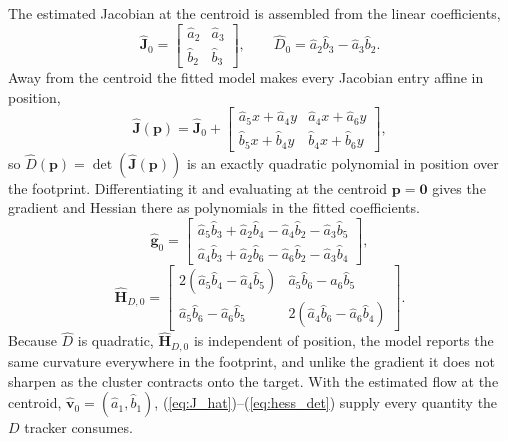 \documentclass[lettersize,journal]{IEEEtran}
\begin{document}
The estimated Jacobian at the centroid is assembled from the linear
coefficients,
\begin{equation}
    \hat{\mathbf{J}}_0 =
    \begin{bmatrix}
        \hat{a}_2 & \hat{a}_3 \\ \hat{b}_2 & \hat{b}_3
    \end{bmatrix},
    \qquad
    \hat{D}_0 = \hat{a}_2 \hat{b}_3 - \hat{a}_3 \hat{b}_2.
    \label{eq:J_hat}
\end{equation}
Away from the centroid the fitted model makes every Jacobian entry affine
in position,
\begin{equation}
    \hat{\mathbf{J}}(\mathbf{p}) = \hat{\mathbf{J}}_0 +
    \begin{bmatrix}
        \hat{a}_5 x + \hat{a}_4 y &
        \hat{a}_4 x + \hat{a}_6 y \\
        \hat{b}_5 x + \hat{b}_4 y &
        \hat{b}_4 x + \hat{b}_6 y
    \end{bmatrix},
\end{equation}
so $\hat{D}(\mathbf{p}) = \det(\hat{\mathbf{J}}(\mathbf{p}))$ is an exactly
quadratic polynomial in position over the footprint. Differentiating
it and evaluating at the centroid $\mathbf{p} = \mathbf{0}$ gives the
gradient and Hessian there as polynomials in the fitted coefficients.
\begin{equation}
    \hat{\mathbf{g}}_0 =
    \begin{bmatrix}
        \hat{a}_5 \hat{b}_3 + \hat{a}_2 \hat{b}_4
            - \hat{a}_4 \hat{b}_2 - \hat{a}_3 \hat{b}_5 \\
        \hat{a}_4 \hat{b}_3 + \hat{a}_2 \hat{b}_6
            - \hat{a}_6 \hat{b}_2 - \hat{a}_3 \hat{b}_4
    \end{bmatrix},
    \label{eq:grad_det}
\end{equation}
\begin{equation}
    \hat{\mathbf{H}}_{D,0} =
    \begin{bmatrix}
        2(\hat{a}_5 \hat{b}_4 - \hat{a}_4 \hat{b}_5) &
        \hat{a}_5 \hat{b}_6 - \hat{a}_6 \hat{b}_5 \\
        \hat{a}_5 \hat{b}_6 - \hat{a}_6 \hat{b}_5 &
        2(\hat{a}_4 \hat{b}_6 - \hat{a}_6 \hat{b}_4)
    \end{bmatrix}.
    \label{eq:hess_det}
\end{equation}
Because $\hat{D}$ is quadratic, $\hat{\mathbf{H}}_{D,0}$ is independent of
position, the model reports the same curvature everywhere in the
footprint, and unlike the gradient it does not sharpen as the cluster
contracts onto the target. With the estimated flow at the centroid,
$\hat{\mathbf{v}}_0 = (\hat{a}_1, \hat{b}_1)$,
(\ref{eq:J_hat})--(\ref{eq:hess_det}) supply every quantity the $D$
tracker consumes.
\end{document}
